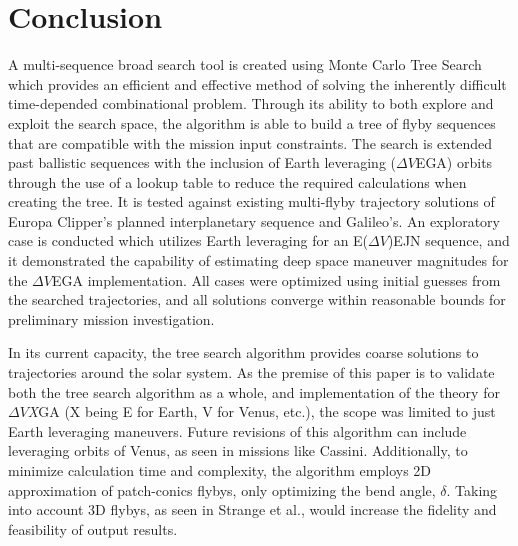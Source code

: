 \documentclass[letterpaper, preprint, paper,11pt]{AAS}	%
\begin{document}
\section*{Conclusion}

A multi-sequence broad search tool is created using Monte Carlo Tree Search which provides an efficient and effective method of solving the inherently difficult time-depended combinational problem. Through its ability to both explore and exploit the search space, the algorithm is able to build a tree of flyby sequences that are compatible with the mission input constraints. The search is extended past ballistic sequences with the inclusion of Earth leveraging ($\Delta V$EGA) orbits through the use of a lookup table to reduce the required calculations when creating the tree. It is tested against existing multi-flyby trajectory solutions of Europa Clipper's planned interplanetary sequence and Galileo's. An exploratory case is conducted which utilizes Earth leveraging for an E($\Delta V$)EJN sequence, and it demonstrated the capability of estimating deep space maneuver magnitudes for the $\Delta V$EGA implementation. All cases were optimized using initial guesses from the searched trajectories, and all solutions converge within reasonable bounds for preliminary mission investigation.

In its current capacity, the tree search algorithm provides coarse solutions to trajectories around the solar system. As the premise of this paper is to validate both the tree search algorithm as a whole, and implementation of the theory for $\Delta V$\textit{X}GA (X being E for Earth, V for Venus, etc.), the scope was limited to just Earth leveraging maneuvers. Future revisions of this algorithm can include leveraging orbits of Venus, as seen in missions like Cassini. Additionally, to minimize calculation time and complexity, the algorithm employs 2D approximation of patch-conics flybys, only optimizing the bend angle, $\delta$. Taking into account 3D flybys, as seen in Strange et al.\cite{Strange2008}, would increase the fidelity and feasibility of output results.

\end{document}
